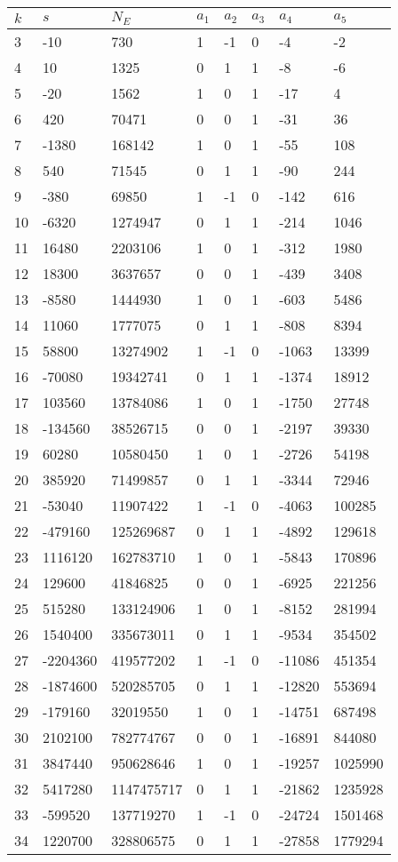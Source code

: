 \documentclass{amsart}
\begin{document}
\begin{longtable}{|l|l|l|lllll|}
\hline
$k$ & $s$ & $N_E$ & $a_1$ & $a_2$ & $a_3$ & $a_4$ & $a_5$\\
\hline
3&-10&730&1&-1&0&-4&-2\\
4&10&1325&0&1&1&-8&-6\\
5&-20&1562&1&0&1&-17&4\\
6&420&70471&0&0&1&-31&36\\
7&-1380&168142&1&0&1&-55&108\\
8&540&71545&0&1&1&-90&244\\
9&-380&69850&1&-1&0&-142&616\\
10&-6320&1274947&0&1&1&-214&1046\\
11&16480&2203106&1&0&1&-312&1980\\
12&18300&3637657&0&0&1&-439&3408\\
13&-8580&1444930&1&0&1&-603&5486\\
14&11060&1777075&0&1&1&-808&8394\\
15&58800&13274902&1&-1&0&-1063&13399\\
16&-70080&19342741&0&1&1&-1374&18912\\
17&103560&13784086&1&0&1&-1750&27748\\
18&-134560&38526715&0&0&1&-2197&39330\\
19&60280&10580450&1&0&1&-2726&54198\\
20&385920&71499857&0&1&1&-3344&72946\\
21&-53040&11907422&1&-1&0&-4063&100285\\
22&-479160&125269687&0&1&1&-4892&129618\\
23&1116120&162783710&1&0&1&-5843&170896\\
24&129600&41846825&0&0&1&-6925&221256\\
25&515280&133124906&1&0&1&-8152&281994\\
26&1540400&335673011&0&1&1&-9534&354502\\
27&-2204360&419577202&1&-1&0&-11086&451354\\
28&-1874600&520285705&0&1&1&-12820&553694\\
29&-179160&32019550&1&0&1&-14751&687498\\
30&2102100&782774767&0&0&1&-16891&844080\\
31&3847440&950628646&1&0&1&-19257&1025990\\
32&5417280&1147475717&0&1&1&-21862&1235928\\
33&-599520&137719270&1&-1&0&-24724&1501468\\
34&1220700&328806575&0&1&1&-27858&1779294\\

\end{longtable}
\end{document}
